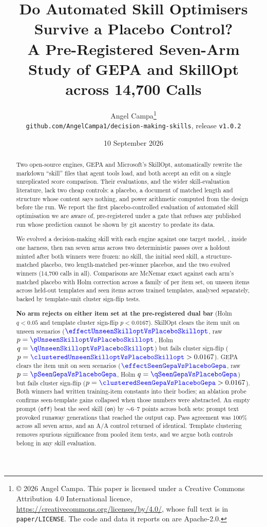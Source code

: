 \documentclass[11pt]{article}
\title{Do Automated Skill Optimisers Survive a Placebo Control?\\
\large A Pre-Registered Seven-Arm Study of GEPA and SkillOpt across 14,700 Calls}
\author{Angel Campa\thanks{\copyright{} 2026 Angel Campa. This paper is licensed
under a Creative Commons Attribution 4.0 International licence,
\protect\url{https://creativecommons.org/licenses/by/4.0/}, whose full text is
in \texttt{paper/LICENSE}. The code and data it reports on are Apache-2.0.}\\
\texttt{github.com/AngelCampa1/decision-making-skills}, release \texttt{v1.0.2}}
\date{10 September 2026}
\newcommand{\NUM}[1]{\textcolor{blue}{\texttt{#1}}}
\newcommand{\NUM}[1]{#1}
\begin{document}
\maketitle

\begin{abstract}
Two open-source engines, GEPA and Microsoft's SkillOpt, automatically rewrite
the markdown ``skill'' files that agent tools load, and both accept an edit on
a single unreplicated score comparison. Their evaluations, and the wider
skill-evaluation literature, lack two cheap controls: a placebo, a document of
matched length and structure whose content says nothing, and power arithmetic
computed from the design before the run. We report the first
placebo-controlled evaluation of automated skill optimisation we are aware
of, pre-registered under a gate that refuses any published run whose
prediction cannot be shown by git ancestry to predate its data.

We evolved a decision-making skill with each engine against one target model,
\NUM{\studyModel}, inside one harness, then ran seven arms across two
deterministic passes over a holdout minted after both winners were frozen:
no skill, the initial seed skill, a structure-matched placebo, two length-matched
per-winner placebos, and the two evolved winners (14,700 calls in all).
Comparisons are McNemar exact against each arm's matched placebo with Holm
correction across a family of \NUM{\familySize} per item set, on
\NUM{\unseenItems} unseen items across \NUM{\templatesUnseen} held-out
templates and \NUM{\seenItems} seen items across \NUM{\templatesSeen} trained
templates, analysed separately, backed by template-unit cluster sign-flip tests.

\textbf{No arm rejects on either item set at the pre-registered dual bar}
(Holm $q < 0.05$ and template cluster sign-flip $p < 0.0167$). SkillOpt clears the
item unit on unseen scenarios ($\NUM{\effectUnseenSkilloptVsPlaceboSkillopt}$,
raw $p = \NUM{\pUnseenSkilloptVsPlaceboSkillopt}$, Holm $q = \NUM{\qUnseenSkilloptVsPlaceboSkillopt}$)
but fails cluster sign-flip ($p = \NUM{\clusteredUnseenSkilloptVsPlaceboSkillopt} > 0.0167$).
GEPA clears the item unit on seen scenarios ($\NUM{\effectSeenGepaVsPlaceboGepa}$,
raw $p = \NUM{\pSeenGepaVsPlaceboGepa}$, Holm $q = \NUM{\qSeenGepaVsPlaceboGepa}$)
but fails cluster sign-flip ($p = \NUM{\clusteredSeenGepaVsPlaceboGepa} > 0.0167$).
Both winners had written training-item constants into their bodies; an ablation
probe confirms seen-template gains collapsed when those numbers were abstracted.
An empty prompt (\texttt{off}) beat the seed skill (\texttt{on}) by $\sim 6$--$7$
points across both sets: prompt text provoked runaway generations that reached the
output cap. Pass agreement was 100\% across all seven arms, and an A/A control
returned \NUM{\aaPairs} of \NUM{\aaPairs} identical.
Template clustering removes spurious significance from pooled item tests, and
we argue both controls belong in any skill evaluation.
\end{abstract}
\end{document}
